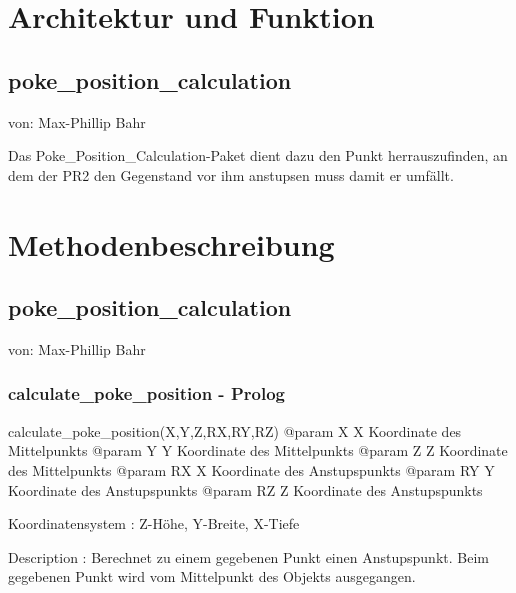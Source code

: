\documentclass{suturo}
\begin{document}

\makeatletter
\newcommand{\chapterauthor}[1]{%
  {\parindent0pt\vspace*{-47pt}%
  \linespread{2.2}\large\begin{flushright}von: #1\end{flushright}%
  \par\nobreak\vspace*{0pt}}
  \@afterheading%
}
\makeatother

\section{Architektur und Funktion}
\subsection{poke\_position\_calculation}
\chapterauthor{Max-Phillip Bahr}
Das Poke\_Position\_Calculation-Paket dient dazu den Punkt herrauszufinden, an dem der PR2 den Gegenstand vor ihm anstupsen muss damit er umfällt.

\begin{figure}[!htb]
\end{figure}
      
\section{Methodenbeschreibung}
\subsection{poke\_position\_calculation}
\chapterauthor{Max-Phillip Bahr}

\subsubsection{calculate\_poke\_position - Prolog}
\begin{spverbatim}
calculate_poke_position(X,Y,Z,RX,RY,RZ)
@param X  X Koordinate des Mittelpunkts
@param Y  Y Koordinate des Mittelpunkts
@param Z  Z Koordinate des Mittelpunkts
@param RX X Koordinate des Anstupspunkts
@param RY Y Koordinate des Anstupspunkts
@param RZ Z Koordinate des Anstupspunkts

Koordinatensystem : Z-Höhe, Y-Breite, X-Tiefe

Description : Berechnet zu einem gegebenen Punkt einen Anstupspunkt. Beim gegebenen Punkt wird vom Mittelpunkt des Objekts ausgegangen.
\end{spverbatim}
\end{document}

